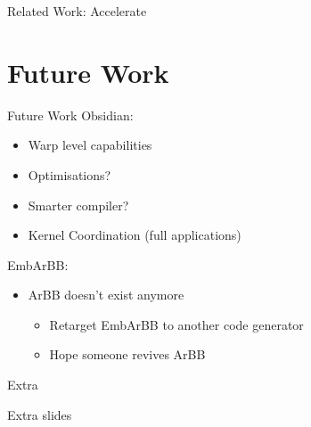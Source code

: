 \documentclass[xcolor=dvipsnames]{beamer}
\begin{document}
\begin{frame}{Related Work: Accelerate}
\begin{center}



\end{center}
\end{frame} 





%
\section{Future Work}
\begin{frame}{Future Work}
Obsidian:
  \begin{itemize} 
    \item Warp level capabilities
    \item Optimisations? 
    \item Smarter compiler? 
    \item Kernel Coordination (full applications) 
  \end{itemize} 
EmbArBB: 
  \begin{itemize} 
    \item ArBB doesn't exist anymore 
      \begin{itemize} 
        \item Retarget EmbArBB to another code generator
        \item Hope someone revives ArBB
      \end{itemize} 
      
  \end{itemize} 
  
\end{frame} 


\begin{frame}{Extra} 

Extra slides

\end{frame}
\end{document}
